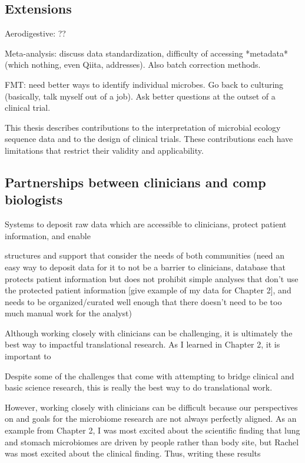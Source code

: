 \subsection{Extensions}

Aerodigestive: ??

Meta-analysis: discuss data standardization, difficulty of accessing *metadata* (which nothing, even Qiita, addresses). Also batch correction methods.

FMT: need better ways to identify individual microbes. Go back to culturing (basically, talk myself out of a job). Ask better questions at the outset of a clinical trial.

This thesis describes contributions to the interpretation of microbial
ecology sequence data and to the design of clinical trials. These contributions
each have limitations that restrict their validity and applicability.


\subsection{Partnerships between clinicians and comp biologists}

Systems to deposit raw data which are accessible to clinicians, protect patient information, and enable

structures and support that consider the needs of both communities (need an easy way to deposit data for it to not be a barrier to clinicians, database that protects patient information but does not prohibit simple analyses that don't use the protected patient information [give example of my data for Chapter 2], and needs to be organized/curated well enough that there doesn't need to be too much manual work for the analyst)

Although working closely with clinicians can be challenging, it is ultimately the best way to impactful translational research.
As I learned in Chapter 2, it is important to


Despite some of the challenges that come with attempting to bridge clinical and basic science research, this is really the best way to do translational work.



However, working closely with clinicians can be difficult because our perspectives on and goals for the microbiome research are not always perfectly aligned.
As an example from Chapter 2, I was most excited about the scientific finding that lung and stomach microbiomes are driven by people rather than body site, but Rachel was most excited about the clinical finding.
Thus, writing these results

